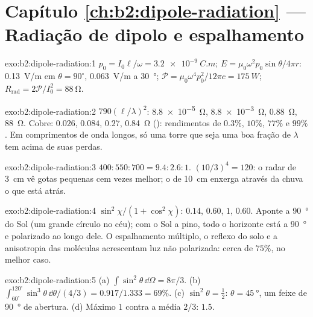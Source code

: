 \section*{Capítulo \ref{ch:b2:dipole-radiation} --- Radiação de dipolo e espalhamento}

\begin{solution}{exo:b2:dipole-radiation:1}
$p_0 = I_0\ell/\omega = \qty{3.2e-9}{C.m}$; $E = \mu_0\omega^2p_0\sin\theta/4\pi r$: \qty{0.13}{V/m}
em $\theta = 90^\circ$, \qty{0.063}{V/m} a \qty{30}{\degree}; $\mathcal P = \mu_0\omega^4p_0^2/12\pi c =
\qty{175}{W}$; $R_{\text{rad}} = 2\mathcal P/I_0^2 = \qty{88}{\ohm}$.
\end{solution}

\begin{solution}{exo:b2:dipole-radiation:2}
$790(\ell/\lambda)^2$: \qty{8.8e-5}{\ohm}, \qty{8.8e-3}{\ohm}, \qty{0.88}{\ohm}, \qty{88}{\ohm}. Cobre:
$0.026$, $0.084$, $0.27$, \qty{0.84}{\ohm} (): rendimentos de $0.3\%$, $10\%$,
$77\%$ e $99\%$. Em comprimentos de onda longos, só uma torre que seja uma boa fração de
$\lambda$ tem  acima de suas perdas.
\end{solution}

\begin{solution}{exo:b2:dipole-radiation:3}
$400 : 550 : 700 = 9.4 : 2.6 : 1$. $(10/3)^4 = 120$: o radar de \qty{3}{cm}
vê gotas pequenas cem vezes melhor; o de \qty{10}{cm} enxerga
através da chuva o que está atrás.
\end{solution}

\begin{solution}{exo:b2:dipole-radiation:4}
$\sin^2\chi/(1 + \cos^2\chi)$: $0.14$, $0.60$, $1$, $0.60$. Aponte a \qty{90}{\degree} do
Sol (um grande círculo no céu); com o Sol a pino, todo o
horizonte está a \qty{90}{\degree} e polarizado ao longo dele. O espalhamento múltiplo,
o reflexo do solo e a anisotropia das moléculas acrescentam luz não polarizada:
cerca de $75\%$, no melhor caso.
\end{solution}

\begin{solution}{exo:b2:dipole-radiation:5}
(a) $\int\sin^2\theta\,\dd\Omega = 8\pi/3$. (b) $\int_{60^\circ}^{120^\circ}\sin^3\theta\,\dd\theta/
(4/3) = 0.917/1.333 = 69\%$. (c) $\sin^2\theta = \tfrac12$: $\theta = \qty{45}{\degree}$, um
feixe de \qty{90}{\degree} de abertura. (d) Máximo $1$ contra a média $2/3$: $1.5$.
\end{solution}

